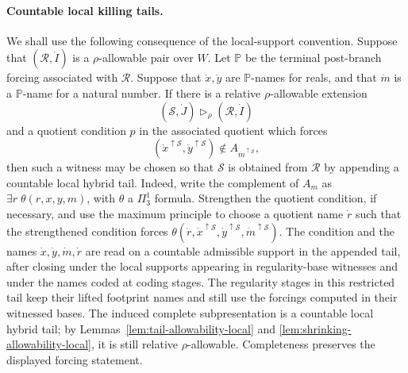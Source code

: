 \documentclass[a4paper,11pt]{article}
\begin{document}
\paragraph{Countable local killing tails.}
We shall use the following consequence of the local-support convention.  Suppose
that \((\mathcal R,\dot I)\) is a \(\rho\)-allowable pair over \(W\).  Let
\(\mathbb P\) be the terminal post-branch forcing associated with \(\mathcal R\).
Suppose that \(\dot x,\dot y\) are \(\mathbb P\)-names for reals, and that
\(\dot m\) is a \(\mathbb P\)-name for a natural number.  If there is a relative
\(\rho\)-allowable extension
\[
   (\mathcal S,\dot J)\triangleright_\rho(\mathcal R,\dot I)
\]
and a quotient condition \(p\) in the associated quotient which forces
\[
   (\dot x^{\uparrow\mathcal S},\dot y^{\uparrow\mathcal S})
      \notin A_{\dot m^{\uparrow\mathcal S}},
\]
then such a witness may be chosen so that \(\mathcal S\) is obtained from
\(\mathcal R\) by appending a countable local hybrid tail.  Indeed, write the
complement of \(A_m\) as \(\exists r\;\theta(r,x,y,m)\), with
\(\theta\) a \(\Pi^1_3\) formula.  Strengthen the quotient condition, if
necessary, and use the maximum principle to choose a quotient name \(\dot r\)
such that the strengthened condition forces
\(\theta(\dot r,\dot x^{\uparrow\mathcal S},
\dot y^{\uparrow\mathcal S},\dot m^{\uparrow\mathcal S})\).  The condition and
the names \(\dot x,\dot y,\dot m,\dot r\) are read on a countable admissible
support in the appended tail, after closing under the local supports appearing
in regularity-base witnesses and under the names coded at coding stages.  The
regularity stages in this restricted tail keep their lifted footprint names and
still use the forcings computed in their witnessed bases.  The induced complete
subpresentation is a countable local hybrid tail; by
Lemmas~\ref{lem:tail-allowability-local} and
\ref{lem:shrinking-allowability-local}, it is still relative
\(\rho\)-allowable.  Completeness preserves the displayed forcing statement.
\end{document}
